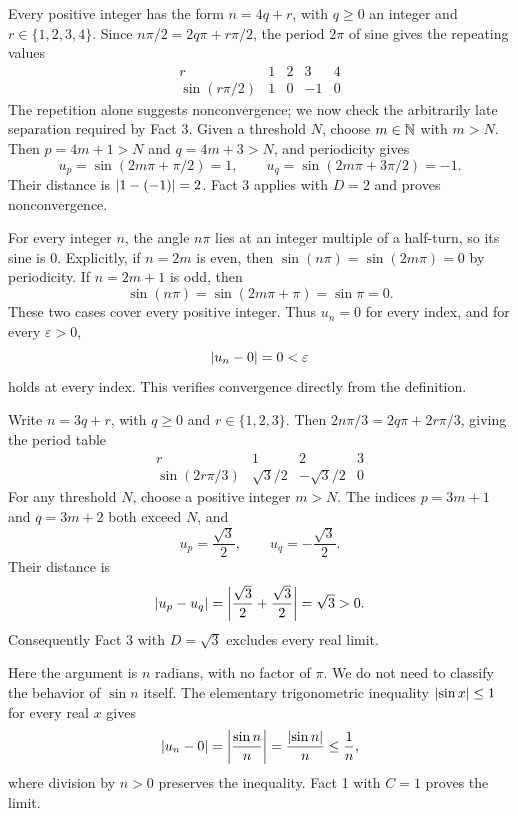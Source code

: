 
Every positive integer has the form $n=4q+r$, with $q\geq0$
an integer and $r\in\{1,2,3,4\}$. Since
$n\pi/2=2q\pi+r\pi/2$, the period $2\pi$ of sine gives
the repeating values
\[
\begin{array}{c|cccc}
 r&1&2&3&4\\ \hline
 \sin(r\pi/2)&1&0&-1&0
\end{array}
\]
The repetition alone suggests nonconvergence; we now check the
arbitrarily late separation required by Fact 3. Given a threshold
$N$, choose $m\in\mathbb{N}$ with $m>N$. Then
$p=4m+1>N$ and $q=4m+3>N$, and periodicity gives
\[
 u_p=\sin(2m\pi+\pi/2)=1,
 \qquad
 u_q=\sin(2m\pi+3\pi/2)=-1.
\]
Their distance is $\left|1-(-1)\right|=2$. Fact 3 applies with
$D=2$ and proves nonconvergence.


For every integer $n$, the angle $n\pi$ lies at an integer multiple
of a half-turn, so its sine is $0$. Explicitly, if $n=2m$ is
even, then $\sin(n\pi)=\sin(2m\pi)=0$ by periodicity.
If $n=2m+1$ is odd, then
\[
 \sin(n\pi)=\sin(2m\pi+\pi)=\sin\pi=0.
\]
These two cases cover every positive integer. Thus $u_n=0$
for every index, and for every $\varepsilon>0$,
\[
 \left|u_n-0\right|=0<\varepsilon
\]
holds at every index. This verifies convergence directly from
the definition.


Write $n=3q+r$, with $q\geq0$ and $r\in\{1,2,3\}$.
Then $2n\pi/3=2q\pi+2r\pi/3$, giving the period table
\[
\begin{array}{c|ccc}
 r&1&2&3\\ \hline
 \sin(2r\pi/3)&\sqrt3/2&-\sqrt3/2&0
\end{array}
\]
For any threshold $N$, choose a positive integer $m>N$.
The indices $p=3m+1$ and $q=3m+2$ both exceed $N$, and
\[
 u_p=\frac{\sqrt3}{2},\qquad
 u_q=-\frac{\sqrt3}{2}.
\]
Their distance is
\[
 \left|u_p-u_q\right|
 =\left|\frac{\sqrt3}{2}+\frac{\sqrt3}{2}\right|
 =\sqrt3>0.
\]
Consequently Fact 3 with $D=\sqrt3$ excludes every real limit.


Here the argument is $n$ radians, with no factor of $\pi$.
We do not need to classify the behavior of $\sin n$ itself.
The elementary trigonometric inequality
$\left|\sin x\right|\leq1$ for every real $x$ gives
\[
 \left|u_n-0\right|
 =\left|\frac{\sin n}{n}\right|
 =\frac{\left|\sin n\right|}{n}
 \leq\frac1n,
\]
where division by $n>0$ preserves the inequality.
Fact 1 with $C=1$ proves the limit.

